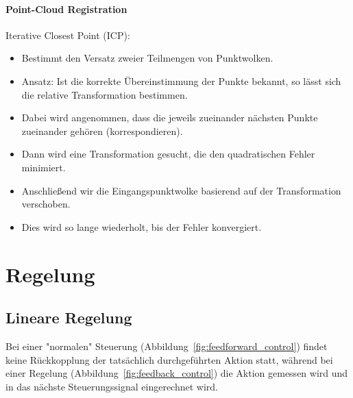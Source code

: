 \documentclass[a4paper, 11pt, accentcolor = tud3b]{tudreport}
\begin{document}
				\subsubsection{Point-Cloud Registration}
					Iterative Closest Point (ICP):
					\begin{itemize}
						\item Bestimmt den Versatz zweier Teilmengen von Punktwolken.
						\item Ansatz: Ist die korrekte Übereinstimmung der Punkte bekannt, so lässt sich die relative Transformation bestimmen.
						\item Dabei wird angenommen, dass die jeweils zueinander nächsten Punkte zueinander gehören (korrespondieren).
						\item Dann wird eine Transformation gesucht, die den quadratischen Fehler minimiert.
						\item Anschließend wir die Eingangspunktwolke basierend auf der Transformation verschoben.
						\item Dies wird so lange wiederholt, bis der Fehler konvergiert.
					\end{itemize}

	\chapter{Regelung} %
		\section{Lineare Regelung}
			Bei einer "normalen" Steuerung (Abbildung~\ref{fig:feedforward_control}) findet keine Rückkopplung der tatsächlich durchgeführten Aktion statt, während bei einer Regelung (Abbildung~\ref{fig:feedback_control}) die Aktion gemessen wird und in das nächste Steuerungssignal eingerechnet wird.
			
\end{document}
